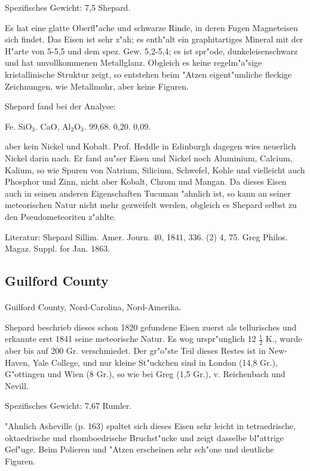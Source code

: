 \documentclass[a4paper, 11pt, oneside]{article}
\begin{document}
Spezifisches Gewicht: 7,5 Shepard.

Es hat eine glatte Oberfl"ache und schwarze Rinde, in deren Fugen Magneteisen sich findet. Das Eisen ist sehr z"ah; es enth"alt ein graphitartiges Mineral mit der H"arte von 5-5,5 und dem spez. Gew. 5,2-5,4; es ist spr"ode, dunkeleisenschwarz und hat unvollkommenen Metallglanz. Obgleich es keine regelm"a"sige kristallinische Struktur zeigt, so entstehen beim "Atzen eigent"umliche fleckige Zeichnungen, wie Metallmohr, aber keine Figuren.

Shepard fand bei der Analyse:

Fe. SiO$_{3}$. CaO, Al$_{2}$O$_{3}$.  
99,68. 0,20. 0,09.

aber kein Nickel und Kobalt. Prof. Heddle in Edinburgh dagegen wies neuerlich Nickel darin nach. Er fand au"ser Eisen und Nickel noch Aluminium, Calcium, Kalium, so wie Spuren von Natrium, Silicium, Schwefel, Kohle und vielleicht auch Phosphor und Zinn, nicht aber Kobalt, Chrom und Mangan. Da dieses Eisen auch in seinen anderen Eigenschaften Tucuman "ahnlich ist, so kann an seiner meteorischen Natur nicht mehr gezweifelt werden, obgleich es Shepard selbst zu den Pseudometeoriten z"ahlte.

Literatur: Shepard Sillim. Amer. Journ. 40, 1841, 336. (2) 4, 75. Greg Philos. Magaz. Suppl. for Jan. 1863.

\subsection{Guilford County}
\normalsize
\paragraph{}
Guilford County, Nord-Carolina, Nord-Amerika.

Shepard beschrieb dieses schon 1820 gefundene Eisen zuerst als tellurisches und erkannte erst 1841 seine meteorische Natur. Es wog urspr"unglich 12 $\frac{1}{2}$ K., wurde aber bis auf 200 Gr. verschmiedet. Der gr"o"ste Teil dieses Restes ist in New-Haven, Yale College, und nur kleine St"uckchen sind in London (14,8 Gr.), G"ottingen und Wien (8 Gr.), so wie bei Greg (1,5 Gr.), v. Reichenbach und Nevill.

Spezifisches Gewicht: 7,67 Rumler.

"Ahnlich Asheville (p. 163) spaltet sich dieses Eisen sehr leicht in tetraedrische, oktaedrische und rhomboedrische Bruchst"ucke und zeigt dasselbe bl"attrige Gef"uge. Beim Polieren und "Atzen erscheinen sehr sch"one und deutliche Figuren.
\end{document}
